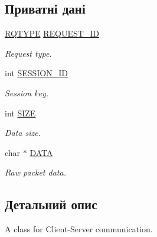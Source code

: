 \subsection*{Приватні дані}
\begin{DoxyCompactItemize}
\item 
\hypertarget{classPacket_a1e3e5174c14d3fa58d84e3449fbc8528}{\hyperlink{packet_8h_a15e96d9e79cfa4c3aaba6861be4707e3}{R\-Q\-T\-Y\-P\-E} \hyperlink{classPacket_a1e3e5174c14d3fa58d84e3449fbc8528}{R\-E\-Q\-U\-E\-S\-T\-\_\-\-I\-D}}\label{classPacket_a1e3e5174c14d3fa58d84e3449fbc8528}

\begin{DoxyCompactList}\small\item\em Request type. \end{DoxyCompactList}\item 
\hypertarget{classPacket_ab961c50e0041597c29c52d1e397c5f91}{int \hyperlink{classPacket_ab961c50e0041597c29c52d1e397c5f91}{S\-E\-S\-S\-I\-O\-N\-\_\-\-I\-D}}\label{classPacket_ab961c50e0041597c29c52d1e397c5f91}

\begin{DoxyCompactList}\small\item\em Session key. \end{DoxyCompactList}\item 
\hypertarget{classPacket_a095ff3c0e41af547f0f7cc2464b0cb87}{int \hyperlink{classPacket_a095ff3c0e41af547f0f7cc2464b0cb87}{S\-I\-Z\-E}}\label{classPacket_a095ff3c0e41af547f0f7cc2464b0cb87}

\begin{DoxyCompactList}\small\item\em Data size. \end{DoxyCompactList}\item 
\hypertarget{classPacket_abc0a29f961bdd40de882e39601884866}{char $\ast$ \hyperlink{classPacket_abc0a29f961bdd40de882e39601884866}{D\-A\-T\-A}}\label{classPacket_abc0a29f961bdd40de882e39601884866}

\begin{DoxyCompactList}\small\item\em Raw packet data. \end{DoxyCompactList}\end{DoxyCompactItemize}


\subsection{Детальний опис}
A class for Client-\/\-Server communication. 

